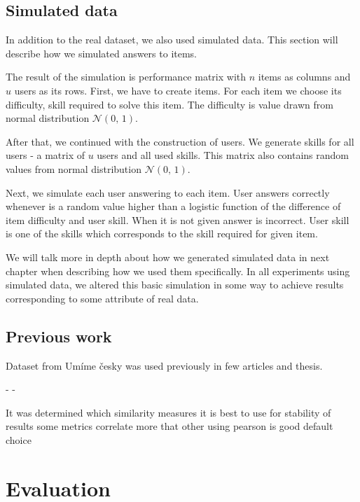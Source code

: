 \documentclass[
  digital, %
  table,   %
  nolof,     %
  nolot,     %
  nocover
]{fithesis3}
\begin{document}


\section{Simulated data}\label{simulated-data}

In addition to the real dataset, we also used simulated data. This section will describe how we simulated answers to items.

The result of the simulation is performance matrix with $n$ items as columns and $u$ users as its rows. First, we have to create items. For each item we choose its difficulty, skill required to solve this item. The difficulty is value drawn from normal distribution $\mathcal{N}(0,\,1)$.

After that, we continued with the construction of users. We generate skills for all users - a matrix of $u$ users and all used skills. This matrix also contains random values from normal distribution $\mathcal{N}(0,\,1)$.

Next, we simulate each user answering to each item. User answers correctly whenever is a random value higher than a logistic function of the difference of item difficulty and user skill. When it is not given answer is incorrect. User skill is one of the skills which corresponds to the skill required for given item.

We will talk more in depth about how we generated simulated data in next chapter when describing how we used them specifically. In all experiments using simulated data, we altered this basic simulation in some way to achieve results corresponding to some attribute of real data.

\section{Previous work}\label{previouw-work}

Dataset from Umíme česky was used previously in few articles and thesis.

- %
-

It was determined which similarity measures it is best to use for stability of results
some metrics correlate more that other
using pearson is good default choice



\chapter{Evaluation}
\end{document}

